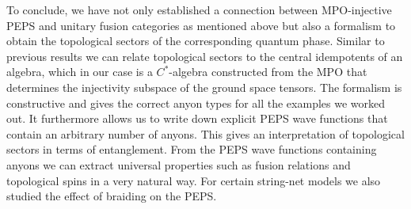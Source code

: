 \documentclass[12 pt]{article}
\begin{document}
To conclude, we have not only established a connection between MPO-injective PEPS and unitary fusion categories as mentioned above but also a formalism to obtain the topological sectors of the corresponding quantum phase. Similar to previous results \cite{Qalgebra,haah} we can relate topological sectors to the central idempotents of an algebra, which in our case is a $C^*$-algebra constructed from the MPO that determines the injectivity subspace of the ground space tensors. The formalism is constructive and gives the correct anyon types for all the examples we worked out. It furthermore allows us to write down explicit PEPS wave functions that contain an arbitrary number of anyons. This gives an interpretation of topological sectors in terms of entanglement. From the PEPS wave functions containing anyons we can extract universal properties such as fusion relations and topological spins in a very natural way. For certain string-net models we also studied the effect of braiding on the PEPS.
\end{document}
